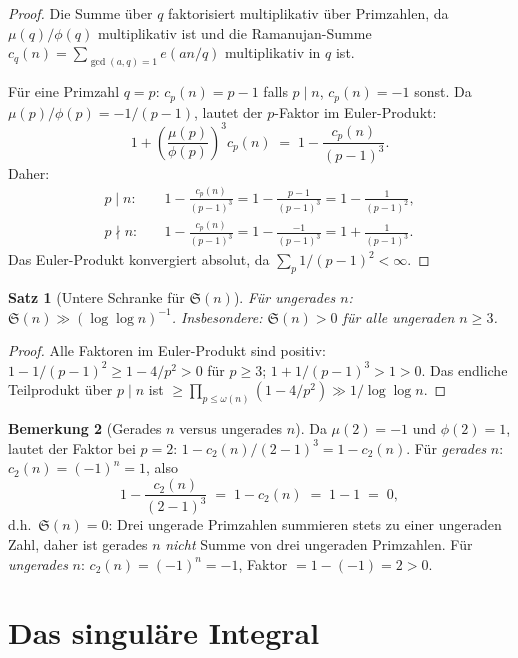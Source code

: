 \documentclass[12pt,a4paper]{amsart}
\newtheorem{theorem}{Satz}[section]
\theoremstyle{definition}
\newtheorem{bemerkung}[theorem]{Bemerkung}
\newcommand{\eq}[1]{e\!\left(#1\right)}
\begin{document}
\begin{proof}
  Die Summe über $q$ faktorisiert multiplikativ über Primzahlen, da
  $\mu(q)/\phi(q)$ multiplikativ ist und die Ramanujan-Summe
  $c_q(n) = \sum_{\gcd(a,q)=1} \eq{an/q}$ multiplikativ in $q$ ist.

  Für eine Primzahl $q = p$: $c_p(n) = p-1$ falls $p \mid n$, $c_p(n) = -1$ sonst.
  Da $\mu(p)/\phi(p) = -1/(p-1)$, lautet der $p$-Faktor im Euler-Produkt:
  \[
    1 + \left(\frac{\mu(p)}{\phi(p)}\right)^3 c_p(n)
    \;=\; 1 - \frac{c_p(n)}{(p-1)^3}.
  \]
  Daher:
  \begin{align*}
    p \mid n: &\quad 1 - \frac{c_p(n)}{(p-1)^3}
               = 1 - \frac{p-1}{(p-1)^3} = 1 - \frac{1}{(p-1)^2}, \\
    p \nmid n: &\quad 1 - \frac{c_p(n)}{(p-1)^3}
               = 1 - \frac{-1}{(p-1)^3} = 1 + \frac{1}{(p-1)^3}.
  \end{align*}
  Das Euler-Produkt konvergiert absolut, da $\sum_p 1/(p-1)^2 < \infty$.
\end{proof}

\begin{theorem}[Untere Schranke für $\mathfrak{S}(n)$]\label{thm:untere_schranke}
  Für ungerades $n$: $\mathfrak{S}(n) \gg (\log\log n)^{-1}$.
  Insbesondere: $\mathfrak{S}(n) > 0$ für alle ungeraden $n \geq 3$.
\end{theorem}

\begin{proof}
  Alle Faktoren im Euler-Produkt sind positiv:
  $1 - 1/(p-1)^2 \geq 1 - 4/p^2 > 0$ für $p \geq 3$;
  $1 + 1/(p-1)^3 > 1 > 0$.  Das endliche Teilprodukt über $p \mid n$
  ist $\geq \prod_{p \leq \omega(n)} (1 - 4/p^2) \gg 1/\log\log n$.
\end{proof}

\begin{bemerkung}[Gerades $n$ versus ungerades $n$]
  Da $\mu(2) = -1$ und $\phi(2) = 1$, lautet der Faktor bei $p=2$:
  $1 - c_2(n)/(2-1)^3 = 1 - c_2(n)$.
  Für \emph{gerades} $n$: $c_2(n) = (-1)^n = 1$, also
  \[
    1 - \frac{c_2(n)}{(2-1)^3} \;=\; 1 - c_2(n) \;=\; 1 - 1 \;=\; 0,
  \]
  d.h.\ $\mathfrak{S}(n) = 0$: Drei ungerade Primzahlen summieren stets zu
  einer ungeraden Zahl, daher ist gerades $n$ \emph{nicht} Summe von drei
  ungeraden Primzahlen.
  Für \emph{ungerades} $n$: $c_2(n) = (-1)^n = -1$, Faktor $= 1-(-1) = 2 > 0$.
\end{bemerkung}

\section{Das singuläre Integral}
\label{sec:sing_int}
\end{document}
